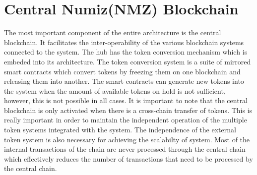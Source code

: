 \documentclass[a4paper,twoside,phd]{BYUPhys}
\begin{document}
\section{Central Numiz(NMZ) Blockchain}
The most important component of the entire architecture is the central blockchain. It facilitates the inter-operability of the various blockchain systems connected to the system. The hub has the token conversion mechanism which is embeded into its architecture. The token conversion system is a suite of mirrored smart contracts which convert tokens by freezing them on one blockchain and releasing them into another. The smart contracts can generate new tokens into the system when the amount of available tokens on hold is not sufficient, however, this is not possible in all cases. It is important to note that the central blockchain is only activated when there is a cross-chain transfer of tokens. This is really important in order to maintain the independent operation of the multiple token systems integrated with the system. The independence of the external token system is also necessary for achieving the scalabilty of system. Most of the internal transactions of the chain are never processed through the central chain which effectively reduces the number of transactions that need to be processed by the central chain.
\end{document}
